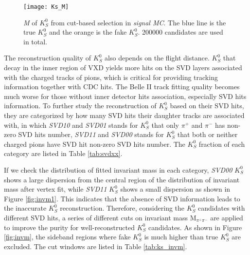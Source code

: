 \begin{figure}[ht]
	\centering 
	\texttt{[image: Ks\_M]}
	\caption{\textit{M} of $K_S^0$ from cut-based selection in \textit{signal MC}. The blue line is the true $K_S^0$ and the orange is the fake $K_S^0$. 200000 candidates are used in total. }
	\label{fig:ksM_sigmc}
\end{figure}
\begin{comment}
The $K_S^0$ candidates from ``stdKshort:merged" is the default way to obtain $K_S^0$ in the current BASF2, 
however, the limitation of this cut-based $K_S^0$ reconstruction is the pollution from fake $K_S^0$. Using these $K_S^0$ candidates to reconstruct $B^0 \to K_S^0  K_S^0  K_S^0$, as long as one of three $K_S^0$ is fake, the reconstructed $B^0$ is fake, too. 
\end{comment}

The reconstruction quality of $K_S^0$ also depends on the flight distance. $K_S^0$ that decay in the inner region of VXD yields more hits on the SVD layers associated with the charged tracks of pions, which is critical for providing tracking information together with CDC hits. The Belle II track fitting quality becomes much worse for those without inner detector hits association, especially SVD hits information. To further study the reconstruction of $K_S^0$ based on their SVD hits, they are categorized by how many SVD hits their daughter tracks are associated with, in which \textit{SVD10} and \textit{SVD01} stands for $K_S^0$ that only $\pi^+$ and $\pi^-$ has non-zero SVD hits number, \textit{SVD11} and \textit{SVD00} stands for $K_S^0$ that both or neither charged pions have SVD hit non-zero SVD hits number. The $K_S^0$ fraction of each category are listed in Table \ref{tab:svdxx}. 
 
If we check the distribution of fitted invariant mass in each category, \textit{SVD00} $K_S^0$ shows a large dispersion from the central region of the distribution of invariant mass after vertex fit, while \textit{SVD11} $K_S^0$ shows a small dispersion as shown in Figure \ref{fig:invm1}. This indicates that the absence of SVD information leads to the inaccurate $K_S^0$ reconstruction. Therefore, considering the $K_S^0$ candidates with different SVD hits, a series of different cuts on invariant mass M$_{\pi^+\pi^-}$ are applied to improve the purity for well-reconstructed $K_S^0$ candidates. As shown in Figure \ref{fig:invm}, the sideband regions where fake $K_S^0$ is much higher than true $K_S^0$ are excluded. The cut windows are listed in Table \ref{tab:ks_invm}. 
 
